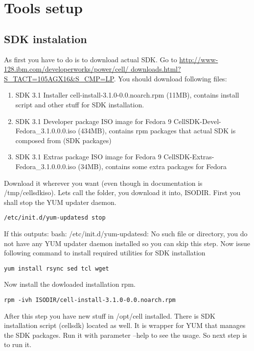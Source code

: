 \chapter{Tools setup}
\label{toolsSetup}

\section{SDK instalation}

As first you have to do is to download actual SDK. Go to \url{http://www-128.ibm.com/developerworks/power/cell/ downloads.html?S_TACT=105AGX16&S_CMP=LP}. You should download following files:

\begin{enumerate} 
\item SDK 3.1 Installer 
cell-install-3.1.0-0.0.noarch.rpm  (11MB), contains install script and other stuff for SDK installation.
\item SDK 3.1 Developer package ISO image for Fedora 9 
CellSDK-Devel-Fedora\_3.1.0.0.0.iso  (434MB), contains rpm packages that actual SDK is composed from (SDK packages) 
\item SDK 3.1 Extras package ISO image for Fedora 9 
CellSDK-Extras-Fedora\_3.1.0.0.0.iso  (34MB), contains some extra packages for Fedora
\end{enumerate}

Download it wherever you want (even though in documentation is /tmp/cellsdkiso). Lets call the folder, you download it into, ISODIR.  First you shall stop the YUM updater daemon.

\begin{verbatim}
/etc/init.d/yum-updatesd stop
\end{verbatim}

If this outputs: bash: /etc/init.d/yum-updatesd: No such file or directory, you do not have any YUM updater daemon installed so you can skip this step. Now issue following command to install required utilities for SDK installation

\begin{verbatim}
yum install rsync sed tcl wget
\end{verbatim}

Now install the dowloaded installation rpm.

\begin{verbatim}
rpm -ivh ISODIR/cell-install-3.1.0-0.0.noarch.rpm
\end{verbatim}

After this step you have new stuff in /opt/cell installed. There is SDK installation script (cellsdk) located as well. It is wrapper for YUM that manages the SDK packages. Run it with parameter --help to see the usage. So next step is to run it. 

